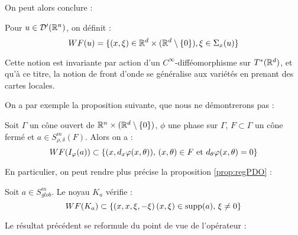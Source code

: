 On peut alors conclure :

\begin{defn}
	Pour $u \in \mathcal{D'}(\mathbb{R}^n)$, on définit :
	\begin{equation*}
	WF(u)=\{(x,\xi)\in \mathbb{R}^d\times(\mathbb{R}^d\setminus \{0\}), \xi \in \Sigma_x(u)\}
	\end{equation*}
\end{defn}
Cette notion est invariante par action d'un $C^{\infty}$-difféomorphisme sur $T^*(\mathbb{R}^d)$, et qu'à ce titre, la notion de front d'onde se généralise aux variétés en prenant des cartes locales.

On a par exemple la proposition suivante, que nous ne démontrerons pas :

\begin{prop}
	Soit $\Gamma$ un cône ouvert de $\mathbb{R}^n \times (\mathbb{R}^d \setminus \{0\})$, $\phi$ une phase sur $\Gamma$, $F\subset \Gamma$ un cône fermé et $a \in S^m_{\rho,\delta}(F)$. Alors on a :
	\begin{equation*}
		WF(I_{\varphi}(a))\subset \{(x,d_x\varphi(x,\theta)),\,(x,\theta)\in F \text{ et }d_{\theta}\varphi(x,\theta)=0\}
	\end{equation*}
\end{prop}

En particulier, on peut rendre plus précise la proposition \ref{prop:regPDO} :
\begin{corr}
	Soit $a \in S^m_{glob}$. Le noyau $K_a$ vérifie :
	\begin{equation*}
		WF(K_a)\subset \{(x,x,\xi,-\xi)\,(x,\xi)\in \operatorname{supp} (a),\,\xi\neq 0\}
	\end{equation*}
\end{corr}

Le résultat précédent se reformule du point de vue de l'opérateur :

